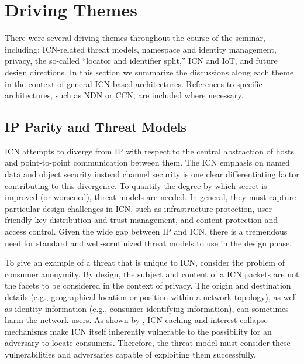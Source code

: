 \section{Driving Themes} \label{sec:themes}
There were several driving themes throughout the course of the seminar, including:
ICN-related threat models, namespace and identity management, privacy, the
so-called ``locator and identifier split,'' ICN and IoT, and future design directions.
In this section we summarize the discussions along each theme in the context
of general ICN-based architectures. References to specific architectures, such as
NDN or CCN, are included where necessary.

\subsection{IP Parity and Threat Models}
ICN attempts to diverge from IP with respect
to the central abstraction of hosts and point-to-point communication between
them. The ICN emphasis on named data and object security instead channel security
is one clear differentiating factor contributing to this divergence. To quantify
the degree by which secret is improved (or worsened), threat models are needed.
In general, they must capture particular design challenges in ICN, such as
infrastructure protection, user-friendly key distribution and trust management, and
content protection and access control.  Given the wide gap between IP and ICN,
there is a tremendous need for standard and well-scrutinized threat models to use in the design phase.

To give an example of a threat that is unique to ICN, consider the
problem of consumer anonymity. By design, the subject and content
of a ICN packets are not the facets to be considered in the context of privacy.
The origin and destination details (e.g., geographical location or position within a network
topology), as well as identity information (e.g., consumer identifying information),
can sometimes harm the network users. As shown by \cite{compagno2015violating}, ICN caching and
interest-collapse mechanisms make ICN itself inherently vulnerable to the possibility for an
adversary to locate consumers. Therefore, the threat model must consider these vulnerabilities
and adversaries capable of exploiting them successfully.

